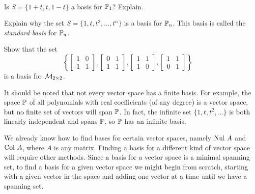 \begin{activity} \label{act:5_b_1} ~
	\ba
	\item Is $S = \{1+t, t, 1-t\}$ a basis for $\mathbb{P}_1$? Explain.



	\item Explain why the set $S = \{1, t, t^2, \ldots, t^n\}$ is a basis for $\mathbb{P}_n$. This basis is called the \emph{standard basis} for $\mathbb{P}_n$.



	\item Show that the set 
	\[\left\{ \left[ \begin{array}{cc} 1&0 \\ 1&1 \end{array} \right], \left[ \begin{array}{cc} 0&1 \\ 1&1 \end{array} \right], \left[ \begin{array}{cc} 1&1 \\ 1&0 \end{array} \right], \left[ \begin{array}{cc} 1&1 \\ 0&1 \end{array} \right] \right\}\]
	is a basis for $\mathcal{M}_{2 \times 2}$. 

	\ea
\end{activity}



It should be noted that not every vector space has a finite basis. For example, the space $\mathbb{P}$ of all polynomials with real coefficients (of any degree) is a vector space, but no finite set of vectors will span $\mathbb{P}$. In fact, the infinite set $\{1, t, t^2, \ldots\}$ is both linearly independent and spans $\mathbb{P}$, so $\mathbb{P}$ has an infinite basis. 

\label{sec:basis_vec_space}

We already know how to find bases for certain vector spaces, namely $\text{Nul } A$ and $\text{Col } A$, where $A$ is any matrix. Finding a basis for a different kind of vector space will require other methods. Since a basis for a vector space is a minimal spanning set, to find a basis for a given vector space we might begin from scratch, starting with a given vector in the space and adding one vector at a time until we have a spanning set. 


